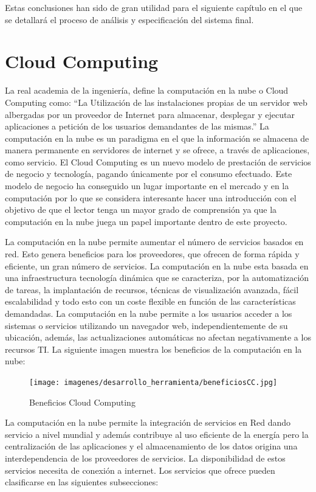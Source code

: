 \documentclass[a4paper,11pt]{book}
\begin{document}
Estas conclusiones  han sido de gran utilidad para el siguiente capítulo en el que se detallará el proceso de análisis y especificación del sistema final.  


\section{Cloud Computing}
La real academia de la ingeniería, define la computación en la nube o Cloud Computing  como: “La Utilización de las instalaciones propias de un servidor web albergadas por un proveedor de Internet para almacenar, desplegar y ejecutar aplicaciones a petición de los usuarios demandantes de las mismas.”\cite{RAI} La computación en la nube es un paradigma en el que la información se almacena de manera permanente en servidores de internet y se ofrece, a través de aplicaciones, como servicio. El Cloud Computing es un nuevo modelo de prestación de servicios\cite{magazine} de negocio y tecnología, pagando únicamente por el consumo efectuado. Este modelo de negocio ha conseguido un lugar importante en el mercado y en la computación  por lo que se considera  interesante hacer una introducción con el objetivo de que el lector tenga un mayor grado de comprensión ya que la computación en la nube juega un papel importante dentro de este proyecto.  

La computación en la nube permite aumentar el número de servicios basados en red. Esto genera beneficios para los proveedores, que ofrecen de forma rápida y eficiente, un gran número de servicios. La computación en la nube esta basada en una infraestructura tecnología dinámica que se caracteriza, por la automatización de tareas, la implantación de recursos, técnicas de visualización avanzada, fácil escalabilidad y todo esto con un coste flexible en función de las características demandadas.  La computación en la nube permite a los usuarios acceder a los sistemas o servicios utilizando un navegador web, independientemente de su ubicación, además,  las actualizaciones automáticas no afectan negativamente a los recursos TI. La siguiente imagen muestra los beneficios de la computación en la nube:

\begin{figure}[H] 
\centering 
\texttt{[image: imagenes/desarrollo\_herramienta/beneficiosCC.jpg]}
\caption{ Beneficios Cloud Computing\cite{beneficios} }
\end{figure}

La computación en la nube permite la integración de servicios en Red dando servicio a nivel mundial y además contribuye al uso eficiente de la energía pero la centralización de las aplicaciones y el almacenamiento de los datos origina una interdependencia de los proveedores de servicios. La disponibilidad de estos servicios necesita de conexión a internet. Los servicios que ofrece pueden clasificarse en las siguientes subsecciones: 
\end{document}
